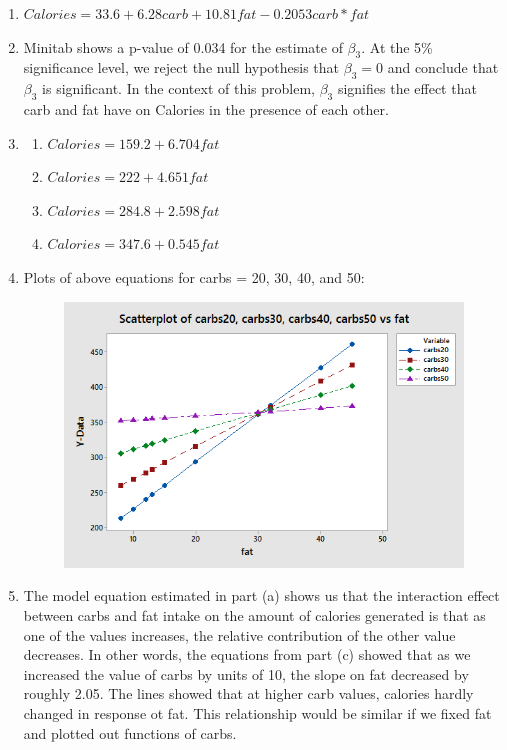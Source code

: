 \documentclass{article}
\providecommand{\tightlist}{%
      \setlength{\itemsep}{0pt}\setlength{\parskip}{0pt}}
\begin{document}
\begin{enumerate}
\def\labelenumi{\alph{enumi})}
\item
  \(Calories = 33.6 + 6.28 carb + 10.81 fat - 0.2053 carb*fat\)
\item
  Minitab shows a p-value of 0.034 for the estimate of \(\beta_3\). At
  the 5\% significance level, we reject the null hypothesis that
  \(\beta_3 = 0\) and conclude that \(\beta_3\) is significant. In the
  context of this problem, \(\beta_3\) signifies the effect that carb
  and fat have on Calories in the presence of each other.
\item
  \begin{enumerate}
  \def\labelenumii{\roman{enumii}.}
  \tightlist
  \item
    \(Calories = 159.2 + 6.704 fat\)
  \item
    \(Calories = 222 + 4.651 fat\)
  \item
    \(Calories = 284.8 + 2.598 fat\)
  \item
    \(Calories = 347.6 + 0.545 fat\)
  \end{enumerate}
\item
Plots of above equations for carbs = 20, 30, 40, and 50:
\begin{figure}[h!]
 \centering
 \includegraphics[scale=.5]{./images/scatterplot_carbs-vs-fat_multiple-lines.png}
\end{figure}

\item
  The model equation estimated in part (a) shows us that the interaction
  effect between carbs and fat intake on the amount of calories
  generated is that as one of the values increases, the relative
  contribution of the other value decreases. In other words, the
  equations from part (c) showed that as we increased the value of carbs
  by units of 10, the slope on fat decreased by roughly 2.05. The lines
  showed that at higher carb values, calories hardly changed in response
  ot fat. This relationship would be similar if we fixed fat and plotted
  out functions of carbs.
\end{enumerate}
\end{document}
